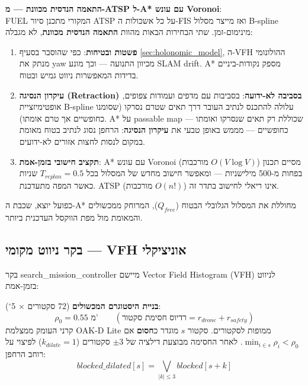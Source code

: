 \documentclass[11pt,a4paper]{article}
\begin{document}
\textbf{התאמה הנדסית מכוונת — מ-\textenglish{ATSP} ל-\textenglish{A*} עם עונש \textenglish{Voronoi}}: \\
\textenglish{FUEL} המקורי מתכנן סיור \textenglish{ATSP} על כל אשכולות ה-\textenglish{FIS} ואז מייצר מסלול \textenglish{B-spline} מינימום-זמן. שתי הבחירות הבאות מהוות \textbf{התאמה הנדסית מכוונת}, לא מגבלה:

\begin{enumerate}
    \item \textbf{פשטות ובטיחות}: כפי שהוסבר בסעיף \ref{sec:holonomic_model}, ה-\textenglish{VFH} ההולונומי מנתק את \textenglish{yaw} מכיוון התנועה — וכך מונע \textenglish{SLAM drift}. \textenglish{A*} מספק נקודות-ביניים בדידות המאפשרות ניווט גמיש ובטוח.
    \item \textbf{עיקרון הנסיגה (\textenglish{Retraction}) בסביבה לא-ידועה}: בסביבות עם מדפים ועמודות צפופים, אופטימיזציית \textenglish{B-spline} עלולה להתכנס לנתיב העובר דרך תאים שטרם נסרקו (שסומנו כחופשיים אך טרם אומתו). \textenglish{A*} על \textenglish{passable map} — שכוללת רק תאים שנסרקו ואומתו כחופשיים — מממש באופן טבעי את \textbf{עיקרון הנסיגה}: הרחפן נסוג לנתיב בטוח מאומת במקום לנסות לחצות אזורים לא-ידועים.
    \item \textbf{תקציב חישובי בזמן-אמת}: \textenglish{A*} עם עונש \textenglish{Voronoi} (מורכבות $O(V\log V)$) מסיים תכנון בפחות מ-500 מילישניות — ומאפשר חישוב מחדש של המסלול בכל $T_{replan}=0.5$ שניות כאשר המפה מתעדכנת. \textenglish{ATSP} (מורכבות $O(n!)$) אינו ריאלי לחישוב בתדר זה.
\end{enumerate}

כפועל יוצא, שכבת ה-\textenglish{A*} מחוללת את המסלול הגלובלי הבטוח ($Q_{free}$), המרוחק ממכשולים והמאומת מול מפת הווקסל העדכנית ביותר.

\subsection{בקר ניווט מקומי — \textenglish{VFH} אוניציקלי}\label{sec:vfh_local}

בקר \textenglish{search\_mission\_controller} מיישם \textenglish{Vector Field Histogram} (\textenglish{VFH}) לניווט בזמן-אמת:

\textbf{בניית היסטוגרם המכשולים} (72 סקטורים $\times$ 5$^{\circ}$):
\begin{equation}
    \rho_0 = 0.55 \text{ מ'} \qquad (\text{רדיוס חסימת סקטור} = r_{drone} + r_{safety})
\end{equation}
קרני העומק ממצלמת \textenglish{OAK-D Lite} ממופות לסקטורים. סקטור $s$ מוגדר כ\textbf{חסום} אם $\min_{i \in s}\rho_i < \rho_0$. לאחר החסימה מבוצעת דילציה של $\pm 3$ סקטורים ($k_{dilate}=1$) לפיצוי על רוחב הרחפן:
\begin{equation}
    blocked\_dilated[s] = \bigvee_{|k| \leq 3} blocked[s+k]
\end{equation}
\end{document}
